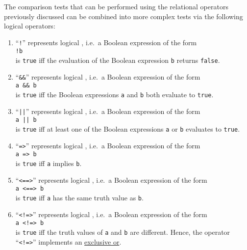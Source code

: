 The comparison tests that can be performed using the relational operators previously discussed can be combined into more
complex tests via the following logical operators:
\begin{enumerate}
\item ``\texttt{!}''  represents logical , i.e.~a Boolean expression of the form
      \\[0.2cm]
      \hspace*{1.3cm}
      \texttt{!b}
      \\[0.2cm]
      is \texttt{true} iff the evaluation of the Boolean expression \texttt{b} returns \texttt{false}.
\item ``\texttt{\&\&}'' represents logical , i.e.~a Boolean expression of the form
      \\[0.2cm]
      \hspace*{1.3cm}
      \texttt{a \&\& b}
      \\[0.2cm]
      is \texttt{true} iff the Boolean expressions \texttt{a} and \texttt{b} both evaluate to \texttt{true}.
\item ``\texttt{||}''  represents logical , i.e.~a Boolean expression of the form
      \\[0.2cm]
      \hspace*{1.3cm}
      \texttt{a || b}
      \\[0.2cm]
      is \texttt{true} iff at least one of the Boolean expressions \texttt{a} or \texttt{b} evaluates to \texttt{true}.
\item ``\texttt{=>}''  represents logical , i.e.~a Boolean expression of the form
      \\[0.2cm]
      \hspace*{1.3cm}
      \texttt{a => b}
      \\[0.2cm]
      is \texttt{true} iff  \texttt{a} implies \texttt{b}.
\item ``\texttt{<==>}''  represents logical , i.e.~a Boolean expression of the form
      \\[0.2cm]
      \hspace*{1.3cm}
      \texttt{a <==> b}
      \\[0.2cm]
      is \texttt{true} iff  \texttt{a} has the same truth value as \texttt{b}.
\item ``\texttt{<!=>}''  represents logical , i.e.~a Boolean expression of the form
      \\[0.2cm]
      \hspace*{1.3cm}
      \texttt{a <!=> b}
      \\[0.2cm]
      is \texttt{true} iff the truth values of \texttt{a} and \texttt{b} are different.  Hence, the operator
      ``\texttt{<!=>}'' implements an \href{https://en.wikipedia.org/wiki/Exclusive_or}{exclusive or}.
\end{enumerate}
